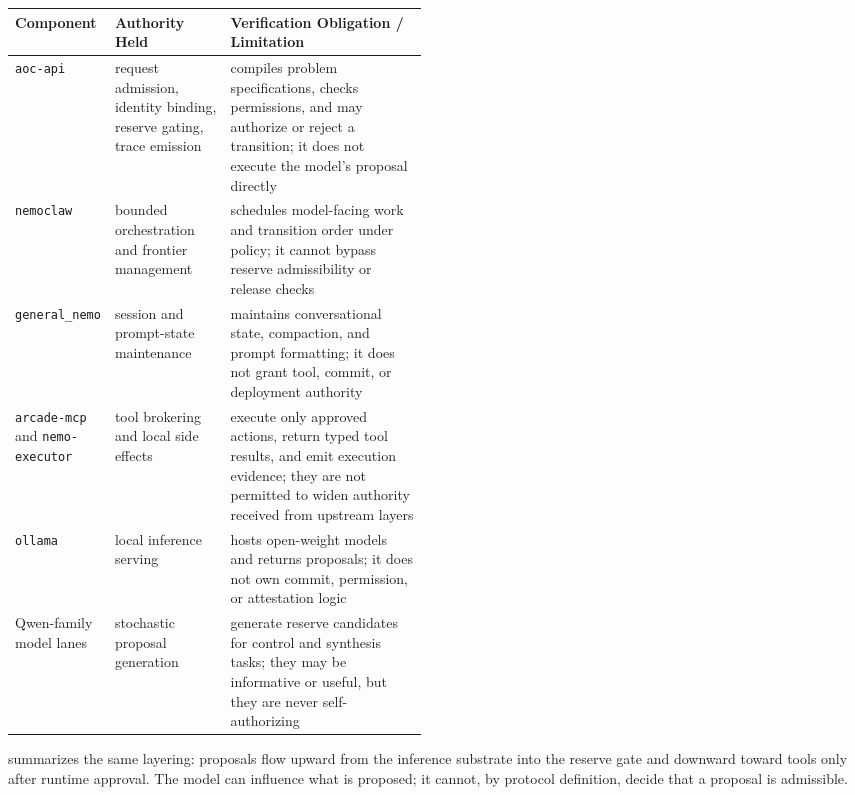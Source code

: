 \documentclass[11pt]{article}
\theoremstyle{remark}
\begin{document}
\begin{center}
\small
\begin{tabularx}{\linewidth}{@{}>{\raggedright\arraybackslash}p{0.20\linewidth}>{\raggedright\arraybackslash}p{0.28\linewidth}X@{}}
\toprule
\textnormal{\textbf{Component}} & \textnormal{\textbf{Authority Held}} & \textnormal{\textbf{Verification Obligation / Limitation}} \\
\midrule
\texttt{aoc-api} & request admission, identity binding, reserve gating, trace emission & compiles problem specifications, checks permissions, and may authorize or reject a transition; it does not execute the model's proposal directly \\
\texttt{nemoclaw} & bounded orchestration and frontier management & schedules model-facing work and transition order under policy; it cannot bypass reserve admissibility or release checks \\
\texttt{general\_nemo} & session and prompt-state maintenance & maintains conversational state, compaction, and prompt formatting; it does not grant tool, commit, or deployment authority \\
\texttt{arcade-mcp} and \texttt{nemo-executor} & tool brokering and local side effects & execute only approved actions, return typed tool results, and emit execution evidence; they are not permitted to widen authority received from upstream layers \\
\texttt{ollama} & local inference serving & hosts open-weight models and returns proposals; it does not own commit, permission, or attestation logic \\
Qwen-family model lanes & stochastic proposal generation & generate reserve candidates for control and synthesis tasks; they may be informative or useful, but they are never self-authorizing \\
\bottomrule
\end{tabularx}
\end{center}

 summarizes the same layering: proposals flow upward from the inference substrate into the reserve gate and downward toward tools only after runtime approval. The model can influence what is proposed; it cannot, by protocol definition, decide that a proposal is admissible.
\end{document}
